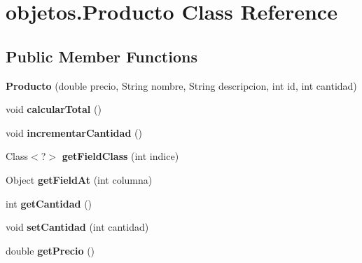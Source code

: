 \hypertarget{classobjetos_1_1_producto}{}\section{objetos.\+Producto Class Reference}
\label{classobjetos_1_1_producto}
\subsection*{Public Member Functions}
\begin{DoxyCompactItemize}
\item 
\mbox{\label{classobjetos_1_1_producto_a2944862f9387c43686583f85fdb9f79f}} 
{\bfseries Producto} (double precio, String nombre, String descripcion, int id, int cantidad)
\item 
\mbox{\label{classobjetos_1_1_producto_aca1868670a4e90738389af3bb5fa3e00}} 
void {\bfseries calcular\+Total} ()
\item 
\mbox{\label{classobjetos_1_1_producto_afb28a08655f512fd3048a20281cbba44}} 
void {\bfseries incrementar\+Cantidad} ()
\item 
\mbox{\label{classobjetos_1_1_producto_a6f54f8859ba9713ddb89fd082e811bd8}} 
Class$<$?$>$ {\bfseries get\+Field\+Class} (int indice)
\item 
\mbox{\label{classobjetos_1_1_producto_a5857c7b25c0113cf682c7ea25a667fab}} 
Object {\bfseries get\+Field\+At} (int columna)
\item 
\mbox{\label{classobjetos_1_1_producto_a33cadb40029d686345420c930bcabacf}} 
int {\bfseries get\+Cantidad} ()
\item 
\mbox{\label{classobjetos_1_1_producto_ae14dcc26bdc312a512627177d4e7e442}} 
void {\bfseries set\+Cantidad} (int cantidad)
\item 
\mbox{\label{classobjetos_1_1_producto_aa4b79134d6f59058f663c5e241bd6389}} 
double {\bfseries get\+Precio} ()
\item 
\mbox{\label{classobjetos_1_1_producto_adbea45187ac465c2a7a2993f4739cb40}} 

\end{DoxyCompactItemize}
